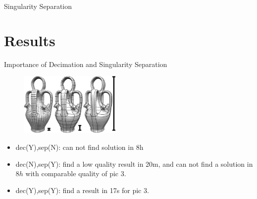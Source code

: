\documentclass{beamer}
\begin{document}
\begin{frame}{Singularity Separation}
\end{frame}


\section{Results}
\begin{frame}{Importance of Decimation and Singularity Separation}
\begin{figure}
\centering
\includegraphics[height=1.2in]{./img/result0.png}
\end{figure}
\begin{itemize}
\item dec(Y),sep(N): can not find solution in 8h
\item dec(N),sep(Y): find a low quality result in 20m, and can not find a solution in $8h$ with comparable quality of pic 3.
\item dec(Y),sep(Y): find a result in 17s for pic 3.
\end{itemize}
\end{frame}
\end{document}
